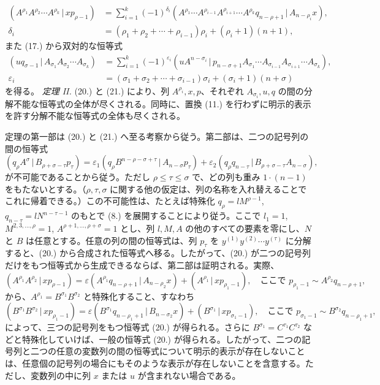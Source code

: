 \documentclass[11pt]{article}
\newcommand{\pair}[2]{(#1\,|\,#2)}
\newcommand{\eps}{\varepsilon}
\begin{document}
\begin{equation}
\begin{aligned}
\pair{A^{\rho_1}A^{\rho_2}\cdots A^{\rho_k}}{xp_{\rho-1}}
&=\sum_{i=1}^{k}(-1)^{\delta_i}\pair{A^{\rho_1}\cdots A^{\rho_{i-1}}A^{\rho_{i+1}}\cdots A^{\rho_k}q_{n-\rho+1}}{A_{n-\rho_i}x},\\
\delta_i&=(\rho_1+\rho_2+\cdots+\rho_{i-1})\rho_i+(\rho_i+1)(n+1),
\end{aligned}
\tag{20}
\end{equation}
また (17.) から双対的な恒等式
\begin{equation}
\begin{aligned}
\pair{u q_{\sigma-1}}{A_{\sigma_1}A_{\sigma_2}\cdots A_{\sigma_k}}
&=\sum_{i=1}^{k}(-1)^{\eps_i}\pair{u A^{n-\sigma_i}}{p_{n-\sigma+1}A_{\sigma_1}\cdots A_{\sigma_{i-1}}A_{\sigma_{i+1}}\cdots A_{\sigma_k}},\\
\eps_i&=(\sigma_1+\sigma_2+\cdots+\sigma_{i-1})\sigma_i+(\sigma_i+1)(n+\sigma)
\end{aligned}
\tag{21}
\end{equation}
を得る。
\emph{定理 II.} (20.) と (21.) により、列 $A^{\rho_i},x,p$、それぞれ $A_{\sigma_i},u,q$ の間の分解不能な恒等式の全体が尽くされる。同時に、置換 (11.) を行わずに明示的表示を許す分解不能な恒等式の全体も尽くされる。

定理の第一部は (20.) と (21.) へ至る考察から従う。第二部は、二つの記号列の間の恒等式
\[
\pair{q_\rho A^\sigma}{B_{\rho+\sigma-\tau}p_\tau}
=\eps_1\pair{q_\rho B^{n-\rho-\sigma+\tau}}{A_{n-\sigma}p_\tau}
+\eps_2\pair{q_\rho q_{n-\tau}}{B_{\rho+\sigma-\tau}A_{n-\sigma}},
\]
が不可能であることから従う。ただし $\rho\le\tau\le\sigma$ で、どの列も重み $1\cdot(n-1)$ をもたないとする。（$\rho,\tau,\sigma$ に関する他の仮定は、列の名称を入れ替えることでこれに帰着できる。）この不可能性は、たとえば特殊化 $q_\rho=lM^{\rho-1}$, $q_{n-\tau}=lN^{n-\tau-1}$ のもとで (8.) を展開することにより従う。ここで $l_1=1$, $M^{2,3,\ldots,\rho}=1$, $A^{\rho+1,\ldots,\rho+\sigma}=1$ とし、列 $l,M,A$ の他のすべての要素を零にし、$N$ と $B$ は任意とする。任意の列の間の恒等式は、列 $p_\tau$ を $y^{(1)}y^{(2)}\cdots y^{(\tau)}$ に分解すると、(20.) から合成された恒等式へ移る。したがって、(20.) が二つの記号列だけをもつ恒等式から生成できるならば、第二部は証明される。実際、
\begin{equation}
\pair{A^{\rho_1}A^{\rho_2}}{xp_{\rho-1}}
=\eps\pair{A^{\rho_1}q_{n-\rho+1}}{A_{n-\rho_2}x}
+\pair{A^{\rho_1}}{xp_{\rho_1-1}},
\quad \text{ここで }p_{\rho_1-1}\sim A^{\rho_2}q_{n-\rho+1},
\tag{20a}
\end{equation}
から、$A^{\rho_1}=B^{\sigma_1}B^{\sigma_2}$ と特殊化すること、すなわち
\[
\pair{B^{\sigma_1}B^{\sigma_2}}{xp_{\rho_1-1}}
=\eps\pair{B^{\sigma_1}q_{n-\rho_1+1}}{B_{n-\sigma_2}x}
+\pair{B^{\sigma_1}}{xp_{\sigma_1-1}},
\quad \text{ここで } p_{\sigma_1-1}\sim B^{\sigma_2}q_{n-\rho_1+1},
\]
によって、三つの記号列をもつ恒等式 (20.) が得られる。さらに $B^{\sigma_1}=C^{\tau_1}C^{\tau_2}$ などと特殊化していけば、一般の恒等式 (20.) が得られる。したがって、二つの記号列と二つの任意の変数列の間の恒等式について明示的表示が存在しないことは、任意個の記号列の場合にもそのような表示が存在しないことを含意する。ただし、変数列の中に列 $x$ または $u$ が含まれない場合である。
\end{document}
